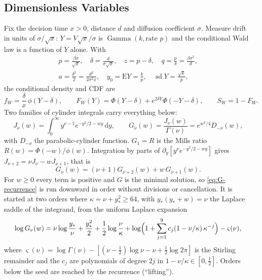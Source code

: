 \documentclass[12pt]{article}
\newcommand{\dd}{\,\mathrm{d}}
\newcommand{\PhiN}{\Phi}
\newcommand{\phiN}{\phi}
\begin{document}
\subsection{Dimensionless Variables}
Fix the decision time $x>0$, distance $d$ and diffusion coefficient $\sigma$. Measure drift in units of $\sigma/\sqrt x$: $Y=V\sqrt x/\sigma$ is $\operatorname{Gamma}(k,\text{rate }p)$ and the conditional Wald law is a function of $Y$ alone. With
\begin{gather*}
  p=\frac{\beta\sigma}{\sqrt x},\quad
  \delta=\frac{d}{\sigma\sqrt x},\quad
  z=p-\delta,\quad
  q=\frac p\delta=\frac{\beta\sigma^2}{d},\\
  a=\frac{\delta^2}{2}=\frac{d^2}{2\sigma^2x},\quad
  y_0=\mathrm EY=\frac kp,\quad \operatorname{sd}Y=\frac{\sqrt k}{p},
\end{gather*}
the conditional density and CDF are
\begin{equation}
  f_W=\frac\delta x\,\phiN(Y-\delta),\qquad
  F_W(Y)=\PhiN(Y-\delta)+e^{2\delta Y}\PhiN(-Y-\delta),\qquad S_W=1-F_W.
\end{equation}
Two families of cylinder integrals carry everything below:
\begin{equation}
  J_\nu(w)=\int_0^\infty y^{\nu-1}e^{-y^2/2-wy}\dd y,\qquad
  G_\nu(w)=\frac{J_\nu(w)}{\Gamma(\nu)}=e^{w^2/4}D_{-\nu}(w),
\end{equation}
with $D_{-\nu}$ the parabolic-cylinder function. $G_1=R$ is the Mills ratio $R(w)=\PhiN(-w)/\phiN(w)$. Integration by parts of $\partial_y[y^\nu e^{-y^2/2-wy}]$ gives $J_{\nu+2}=\nu J_\nu-wJ_{\nu+1}$, that is
\begin{equation}
  G_\nu(w)=(\nu+1)G_{\nu+2}(w)+w\,G_{\nu+1}(w).
  \label{eq:G-recurrence}
\end{equation}
For $w\ge0$ every term is positive and $G$ is the minimal solution, so
\eqref{eq:G-recurrence} is run downward in order without divisions or
cancellation. It is started at two orders where $\kappa=\nu+y_\ast^2\ge64$, with $y_\ast(y_\ast+w)=\nu$ the Laplace saddle of the integrand, from the uniform Laplace expansion
\begin{equation}
  \log G_\nu(w)=\nu\log\frac{y_\ast}{\nu}+\frac{y_\ast^2}{2}
  +\frac12\log\frac\nu\kappa+\log\Bigl(1+\sum_{j=1}^{9}c_j(1-\nu/\kappa)\,\kappa^{-j}\Bigr)
  -\varsigma(\nu),
\end{equation}
where $\varsigma(\nu)=\log\Gamma(\nu)-[(\nu-\tfrac12)\log\nu-\nu+\tfrac12\log2\pi]$ is the Stirling remainder and the $c_j$ are polynomials of degree $2j$ in $1-\nu/\kappa\in[0,\tfrac12]$. Orders below the seed are reached by the recurrence (``lifting'').
\end{document}
